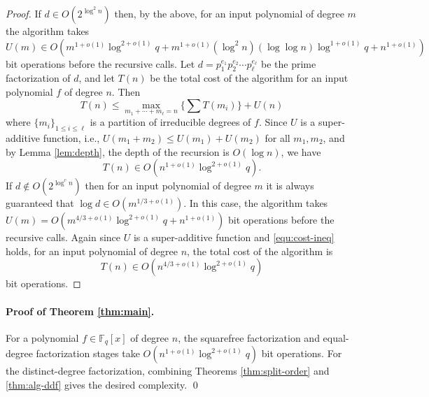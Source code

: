 \documentclass[11pt]{article}
\theoremstyle{plain}
\theoremstyle{definition}
\def\F{\ensuremath{\mathbb{F}}}
\begin{document}
\begin{proof}
	If $d \in O(2^{\log^2n})$ then, by the above, for an input polynomial of degree $m$ the 
	algorithm takes 
	\[ U(m) \in O(m^{1 + o(1)}\log^{2 + o(1)}q + m^{1 + o(1)}(\log^2n)(\log \log n)\log^{1 + o(1)}q 
	+ n^{1 + o(1)})
	\]
	bit operations before the recursive calls. Let $d = p_1^{e_1} p_2^{e_2} \cdots p_\ell^{e_\ell}$ 
	be the prime factorization of $d$, and let $T(n)$ be the total cost of the algorithm for an 
	input polynomial $f$ of degree $n$. Then
	\begin{equation}
	\label{equ:cost-ineq}
		T(n) \le \max_{m_1 + \cdots + m_\ell = n} \{ \sum T(m_i) \} + U(n)
	\end{equation}
	where $\{ m_i \}_{1 \le i \le \ell}$ is a partition of irreducible degrees of $f$. Since $U$ is 
	a super-additive function, i.e., $U(m_1 + m_2) \le U(m_1) + U(m_2)$ for all $m_1, m_2$, and by 
	Lemma \ref{lem:depth}, the depth of the recursion is $O(\log n)$, we have
	\[ T(n) \in O(n^{1 + o(1)} \log^{2 + o(1)}q). \]
	If $d \notin O(2^{\log^cn})$ then for an input polynomial of degree $m$ it is always guaranteed 
	that $\log d \in O(m^{1 / 3 + o(1)})$. In this case, the algorithm takes $U(m) = O(m^{4 / 3 + 
	o(1)} \log^{2 + o(1)}q  + n^{1 + o(1)})$ bit operations before the recursive calls. Again since 
	$U$ is a super-additive function and \eqref{equ:cost-ineq} holds, for an input polynomial of 
	degree $n$, the total cost of the algorithm is
	\[ T(n) \in O(n^{4 / 3 + o(1)} \log^{2 + o(1)}q) \]
	bit operations.
\end{proof}

\paragraph{Proof of Theorem \ref{thm:main}.}
For a polynomial $f \in \F_q[x]$ of degree $n$, the squarefree factorization and equal-degree 
factorization stages take $O(n^{1 + o(1)}\log^{2 + o(1)}q)$ bit operations. For the distinct-degree 
factorization, combining Theorems \ref{thm:split-order} and \ref{thm:alg-ddf} gives the desired 
complexity. \hfil \qed






\end{document}

